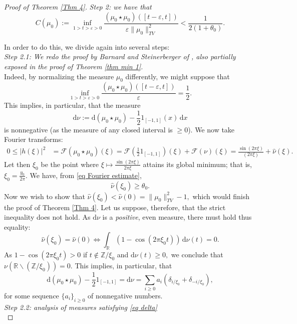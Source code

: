 \documentclass[11pt, reqno]{amsart}
\newcommand{\mmd}{ \mathrm{d}}
\newcommand{\s}{\star}
\numberwithin{equation}{section}
\newcommand{\R}{{\mathbb R}}
\newcommand{\Z}{{\mathbb Z}}
\newcommand{\eps}{{\varepsilon}}
\begin{document}
\begin{proof}[Proof of Theorem \ref{Thm 4}]
\noindent\textit{Step 2: we have that} 
\[
C(\mu_0) := \inf_{1 > t > \eps > 0} \frac{(\mu_0 \s \mu_0)([t-\eps,t])}{\eps \|\mu_0\|_{TV}^2} < \frac{1}{2(1+\theta_0)}.
\]

In order to do this, we divide again into several steps:\\

\noindent\textit{Step 2.1: We redo the proof by Barnard and Steinerberger of \cite[Theorem~2]{BarnardSteinerberger}, also partially exposed in the proof of Theorem \ref{thm min 1}.}\\

Indeed, by normalizing the measure $\mu_0$ differently, we might suppose that 
\[
\inf_{1 > t > \eps > 0} \frac{(\mu_0 \s \mu_0)([t-\eps,t])}{\eps} = \frac{1}{2}.
\]
This implies, in particular, that the measure 
\[
\mmd \nu := \mmd (\mu_0 \s \mu_0) - \frac{1}{2}1_{[-1,1]}(x) \, \mmd x
\]
is nonnegative (as the measure of any closed interval is $\ge 0$). We now take Fourier transforms: 
\begin{align}\label{eq Fourier estimate}
0 \le |h(\xi)|^2 & = \mathcal{F}(\mu_0 \s \mu_0) (\xi) = \mathcal{F}(\frac{1}{2}1_{[-1,1]})(\xi) + \mathcal{F}(\nu)(\xi) = \frac{\sin(2\pi \xi)}{(2\pi \xi)} + \widehat{\nu}(\xi). 
\end{align}
Let then $\xi_0$ be the point where $\xi \mapsto \frac{\sin(2\pi \xi)}{2\pi \xi}$ attains its global minimum; that is, $\xi_0 = \frac{y_0}{2\pi}.$ We have, from \eqref{eq Fourier estimate},
\[
\widehat{\nu}(\xi_0) \ge \theta_0.
\]
Now we wish to show that $\widehat{\nu}(\xi_0) < \widehat{\nu}(0) = \|\mu_0\|_{TV}^2 - 1,$ which would finish the proof of Theorem \ref{Thm 4}. Let us suppose, therefore, that the strict 
inequality does not hold. As $\mmd \nu$ is a \emph{positive}, even measure, there must hold thus equality: 
\[
\widehat{\nu}(\xi_0) = \widehat{\nu}(0) \iff \int_{\R}(1-\cos(2 \pi \xi_0 t)) \, \mmd \nu(t) = 0.
\]
As $1- \cos(2\pi \xi_0 t) > 0$ if $t \not \in \mathbb{Z}/\xi_0$ and $\mmd \nu(t) \ge 0,$ we conclude that $\nu(\R\backslash(\Z/\xi_0)) = 0.$ This implies, in particular, that 
\begin{equation}\label{eq delta}
\mmd(\mu_0 \s \mu_0) - \frac{1}{2} 1_{[-1,1]} = \mmd \nu  = \sum_{i \ge 0} a_i (\delta_{i/\xi_0} + \delta_{-i/\xi_0}),
\end{equation}
for some sequence $\{a_i\}_{i \ge 0}$ of nonnegative numbers.\\ 

\noindent\textit{Step 2.2: analysis of measures satisfying \eqref{eq delta}} \\


\end{proof}
\end{document}
